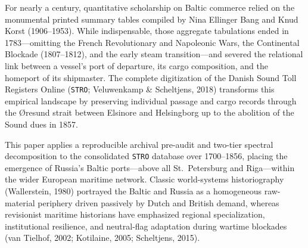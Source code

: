 \documentclass[11pt,a4paper]{article}
\begin{document}
For nearly a century, quantitative scholarship on Baltic commerce relied on the monumental printed summary tables compiled by Nina Ellinger Bang and Knud Korst (1906--1953). While indispensable, those aggregate tabulations ended in 1783—omitting the French Revolutionary and Napoleonic Wars, the Continental Blockade (1807--1812), and the early steam transition—and severed the relational link between a vessel's port of departure, its cargo composition, and the homeport of its shipmaster. The complete digitization of the Danish Sound Toll Registers Online (\texttt{STRO}; Veluwenkamp \& Scheltjens, 2018) transforms this empirical landscape by preserving individual passage and cargo records through the Øresund strait between Elsinore and Helsingborg up to the abolition of the Sound dues in 1857.

This paper applies a reproducible archival pre-audit and two-tier spectral decomposition to the consolidated \texttt{STRO} database over 1700--1856, placing the emergence of Russia's Baltic ports—above all St.~Petersburg and Riga—within the wider European maritime network. Classic world-systems historiography (Wallerstein, 1980) portrayed the Baltic and Russia as a homogeneous raw-material periphery driven passively by Dutch and British demand, whereas revisionist maritime historians have emphasized regional specialization, institutional resilience, and neutral-flag adaptation during wartime blockades (van Tielhof, 2002; Kotilaine, 2005; Scheltjens, 2015).
\end{document}
